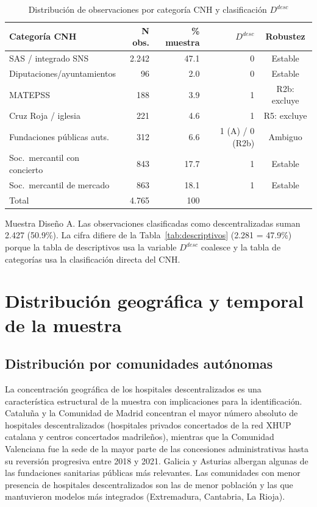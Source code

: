 \documentclass[12pt, a4paper, twoside, openright]{book}
\theoremstyle{plain}
\theoremstyle{definition}
\theoremstyle{remark}
\begin{document}
\begin{table}[htbp]
\centering
\caption{Distribución de observaciones por categoría CNH y clasificación $D^{desc}$}
\label{tab:distribucion_categorias_cnh}
\begin{threeparttable}
\small
\begin{tabular}{lrrrc}
\toprule
\textbf{Categoría CNH} & \textbf{N obs.} & \textbf{\% muestra} & \textbf{$D^{desc}$} & \textbf{Robustez} \\
\midrule
SAS / integrado SNS         & 2.242 & 47.1 & 0 & Estable \\
Diputaciones/ayuntamientos  & 96    & 2.0  & 0 & Estable \\
MATEPSS                     & 188   & 3.9  & 1 & R2b: excluye \\
Cruz Roja / iglesia         & 221   & 4.6  & 1 & R5: excluye \\
Fundaciones públicas auts.  & 312   & 6.6  & 1 (A) / 0 (R2b) & Ambiguo \\
Soc.\ mercantil con concierto & 843  & 17.7 & 1 & Estable \\
Soc.\ mercantil de mercado  & 863   & 18.1 & 1 & Estable \\
\midrule
Total                       & 4.765 & 100  & & \\
\bottomrule
\end{tabular}
\begin{tablenotes}
  \small
  \item Muestra Diseño A. Las observaciones clasificadas como descentralizadas suman 2.427 (50.9\%). La cifra difiere de la Tabla~\ref{tab:descriptivos} (2.281 = 47.9\%) porque la tabla de descriptivos usa la variable $D^{desc}$ coalesce y la tabla de categorías usa la clasificación directa del CNH.
\end{tablenotes}
\end{threeparttable}
\end{table}

\section{Distribución geográfica y temporal de la muestra}
\label{sec:distribucion_muestra}

\subsection{Distribución por comunidades autónomas}

La concentración geográfica de los hospitales descentralizados es una característica estructural de la muestra con implicaciones para la identificación. Cataluña y la Comunidad de Madrid concentran el mayor número absoluto de hospitales descentralizados (hospitales privados concertados de la red XHUP catalana y centros concertados madrileños), mientras que la Comunidad Valenciana fue la sede de la mayor parte de las concesiones administrativas hasta su reversión progresiva entre 2018 y 2021. Galicia y Asturias albergan algunas de las fundaciones sanitarias públicas más relevantes. Las comunidades con menor presencia de hospitales descentralizados son las de menor población y las que mantuvieron modelos más integrados (Extremadura, Cantabria, La Rioja).
\end{document}
